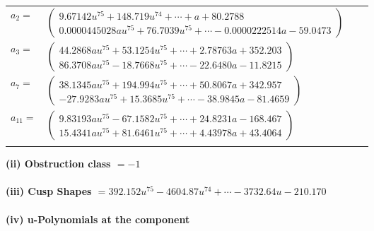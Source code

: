 \documentclass[1p]{elsarticle_modified}
\theoremstyle{definition}
\begin{document}
\begin{tabular}{m{7pt} m{180pt} m{7pt} m{180pt} }
\flushright $a_{2}=$&$\begin{pmatrix}9.67142 u^{75}+148.719 u^{74}+\cdots+a+80.2788\\0.0000445028 a u^{75}+76.7039 u^{75}+\cdots-0.0000222514 a-59.0473\end{pmatrix}$ \\
\flushright $a_{3}=$&$\begin{pmatrix}44.2868 a u^{75}+53.1254 u^{75}+\cdots+2.78763 a+352.203\\86.3708 a u^{75}-18.7668 u^{75}+\cdots-22.6480 a-11.8215\end{pmatrix}$ \\
\flushright $a_{7}=$&$\begin{pmatrix}38.1345 a u^{75}+194.994 u^{75}+\cdots+50.8067 a+342.957\\-27.9283 a u^{75}+15.3685 u^{75}+\cdots-38.9845 a-81.4659\end{pmatrix}$ \\
\flushright $a_{11}=$&$\begin{pmatrix}9.83193 a u^{75}-67.1582 u^{75}+\cdots+24.8231 a-168.467\\15.4341 a u^{75}+81.6461 u^{75}+\cdots+4.43978 a+43.4064\end{pmatrix}$\\&\end{tabular}
\flushleft \textbf{(ii) Obstruction class $= -1$}\\~\\
\flushleft \textbf{(iii) Cusp Shapes $= 392.152 u^{75}-4604.87 u^{74}+\cdots-3732.64 u-210.170$}\\~\\
\newpage\renewcommand{\arraystretch}{1}
\flushleft \textbf{(iv) u-Polynomials at the component}\newline \\
\end{document}
